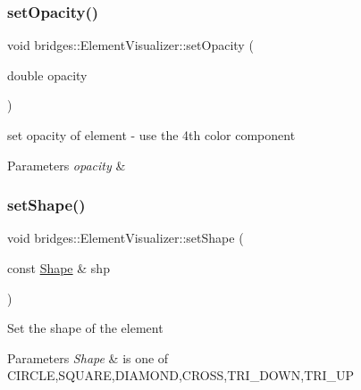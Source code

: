 \subsubsection{\texorpdfstring{set\+Opacity()}{setOpacity()}}
{\footnotesize\ttfamily void bridges\+::\+Element\+Visualizer\+::set\+Opacity (\begin{DoxyParamCaption}\item[{double}]{opacity }\end{DoxyParamCaption})\hspace{0.3cm}{\ttfamily [inline]}}

set opacity of element -\/ use the 4th color component


\begin{DoxyParams}{Parameters}
{\em opacity} & \\
\hline
\end{DoxyParams}
\hypertarget{classbridges_1_1_element_visualizer_af81cc20423f2fedffa81fb7c473a1179}{}\label{classbridges_1_1_element_visualizer_af81cc20423f2fedffa81fb7c473a1179} 
\subsubsection{\texorpdfstring{set\+Shape()}{setShape()}}
{\footnotesize\ttfamily void bridges\+::\+Element\+Visualizer\+::set\+Shape (\begin{DoxyParamCaption}\item[{const \hyperlink{namespacebridges_a1b4050586bd708782ae0d4f3b06b9579}{Shape} \&}]{shp }\end{DoxyParamCaption})\hspace{0.3cm}{\ttfamily [inline]}}

Set the shape of the element


\begin{DoxyParams}{Parameters}
{\em Shape} & is one of C\+I\+R\+C\+LE,S\+Q\+U\+A\+RE,D\+I\+A\+M\+O\+ND,C\+R\+O\+SS,T\+R\+I\+\_\+\+D\+O\+WN,T\+R\+I\+\_\+\+UP \\
\hline
\end{DoxyParams}
\hypertarget{classbridges_1_1_element_visualizer_a6fc924e754008992b310a89d8d88fce9}{}\label{classbridges_1_1_element_visualizer_a6fc924e754008992b310a89d8d88fce9} 

